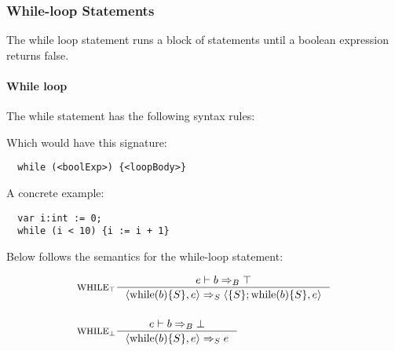 \subsubsection{While-loop Statements}
\label{subsec:whileLoopStatements}

The while loop statement runs a block of statements until a boolean expression returns false.

\paragraph{While loop}
\label{sec:whileLoop}

The while statement has the following syntax rules:


Which would have this signature:

\begin{verbatim}
  while (<boolExp>) {<loopBody>}
\end{verbatim}

A concrete example:

\begin{verbatim}
  var i:int := 0;
  while (i < 10) {i := i + 1}
\end{verbatim}

Below follows the semantics for the while-loop statement:

\begin{align*}
&\inference[$\text{WHILE}_\top$]{e \vdash b \Rightarrow_B \top}
                       {\Braket{\Twhile(b)\{S\},e} \Rightarrow_S \Braket{\{S\}; \Twhile (b)\{S\},e}}
\\\\
&\inference[$\text{WHILE}_\bot$]{e \vdash b \Rightarrow_B \bot}
                       {\Braket{\Twhile(b)\{S\},e} \Rightarrow_S e}
\end{align*}
